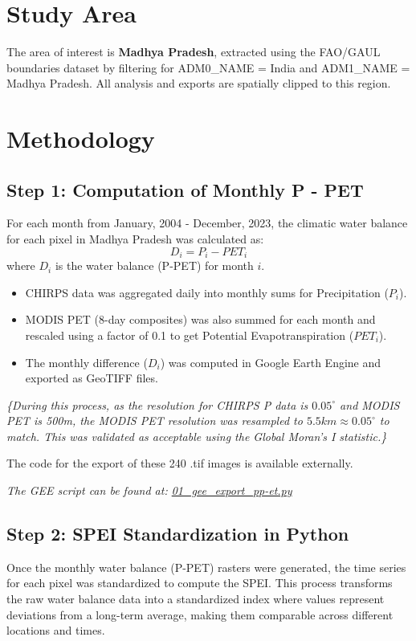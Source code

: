 \documentclass[12pt, a4paper]{article}
\begin{document}
\section{Study Area}
The area of interest is \textbf{Madhya Pradesh}, extracted using the FAO/GAUL boundaries dataset by filtering for ADM0\_NAME = India and ADM1\_NAME = Madhya Pradesh. All analysis and exports are spatially clipped to this region.

\section{Methodology}

\subsection{Step 1: Computation of Monthly P - PET}
For each month from January, 2004 - December, 2023, the climatic water balance for each pixel in Madhya Pradesh was calculated as:
\[ D_i = P_i - PET_i \]
where $D_i$ is the water balance (P-PET) for month $i$.

\begin{itemize}
    \item CHIRPS data was aggregated daily into monthly sums for Precipitation ($P_i$).
    \item MODIS PET (8-day composites) was also summed for each month and rescaled using a factor of 0.1 to get Potential Evapotranspiration ($PET_i$).
    \item The monthly difference ($D_i$) was computed in Google Earth Engine and exported as GeoTIFF files.
\end{itemize}

\textit{\{During this process, as the resolution for CHIRPS P data is $0.05^{\circ}$ and MODIS PET is 500m, the MODIS PET resolution was resampled to $5.5km \approx 0.05^{\circ}$ to match. This was validated as acceptable using the Global Moran's I statistic.\}}

The code for the export of these 240 .tif images is available externally.

\begin{center}
    \textit{The GEE script can be found at: \href{https://github.com/Actuallyanonymous/spei-drought-analysis-pipeline/blob/main/scripts/01_gee_export_pp-et.py}{01\_gee\_export\_pp-et.py}}
\end{center}


\subsection{Step 2: SPEI Standardization in Python}
Once the monthly water balance (P-PET) rasters were generated, the time series for each pixel was standardized to compute the SPEI. This process transforms the raw water balance data into a standardized index where values represent deviations from a long-term average, making them comparable across different locations and times.
\end{document}
